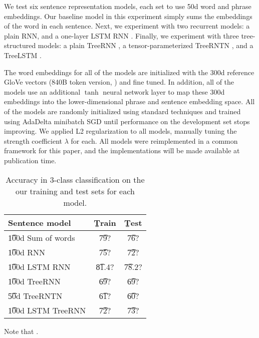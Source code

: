 We test six sentence representation models, each set to use 50d word and phrase embeddings. Our baseline model in this experiment simply sums the embeddings of the word in each sentence. Next, we experiment with two recurrent models: a plain RNN, and a one-layer LSTM RNN \cite{hochreiter1997long}. Finally, we experiment with three tree-structured models: a plain TreeRNN \cite{socher2011semi}, a tensor-parameterized TreeRNTN \cite{socher2013acl1}, and a TreeLSTM \cite{tai2015improved}.

The word embeddings for all of the models are initialized with the 300d reference GloVe vectors (840B token version, \citealt{pennington2014glove}) and fine tuned. In addition, all of the models use an additional $\tanh$ neural network layer to map these 300d embeddings into the lower-dimensional phrase and sentence embedding space. All of the models are randomly initialized using standard techniques and trained using AdaDelta \cite{zeiler2012adadelta} minibatch SGD until performance on the development set stops improving. We applied L2 regularization to all models, manually tuning the strength coefficient $\lambda$ for each. All models were reimplemented in a common framework for this paper, and the implementations will be made available at publication time.

\begin{table}
\begin{center}
\begin{tabular}{l@{\hskip \colspaceL}@{\hskip \colspaceL}c@{\hskip \colspaceL}c}
\hline
\textbf{Sentence model} & \b{Train}  & \b{Test}\\
\hline
\t{100d Sum of words}            & \t{79?} & \t{76?} \\
\t{100d RNN}            & \t{75?} & \t{72?} \\	
\t{100d LSTM RNN}            & \t{81.4?} & \t{78.2?} \\
\t{100d TreeRNN}            & \t{69?} & \t{69?} \\
\t{50d TreeRNTN}            & \t{61?} & \t{60?} \\
\t{100d LSTM TreeRNN}            & \t{72?} & \t{73?} \\
\hline
\end{tabular}
\end{center}
\caption{
\label{tab:nnresults}
Accuracy in 3-class classification on the our training and test sets for each model.
}
\end{table}

Note that .
